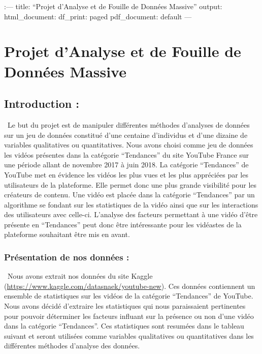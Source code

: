 \documentclass[
]{article}
\author{}
\date{\vspace{-2.5em}}
\begin{document}
:--- title: ``Projet d'Analyse et de Fouille de Données Massive''
output: html\_document: df\_print: paged pdf\_document: default ---

\hypertarget{projet-danalyse-et-de-fouille-de-donnuxe9es-massive}{%
\section{Projet d'Analyse et de Fouille de Données
Massive}\label{projet-danalyse-et-de-fouille-de-donnuxe9es-massive}}

\hypertarget{introduction}{%
\subsection{Introduction :}\label{introduction}}

 Le but du projet est de manipuler différentes méthodes d'analyses de
données sur un jeu de données constitué d'une centaine d'individus et
d'une dizaine de variables qualitatives ou quantitatives. Nous avons
choisi comme jeu de données les vidéos présentes dans la catégorie
``Tendances'' du site YouTube France sur une période allant de novembre
2017 à juin 2018. La catégorie ``Tendances'' de YouTube met en évidence
les vidéos les plus vues et les plus appréciées par les utilisateurs de
la plateforme. Elle permet donc une plus grande visibilité pour les
créateurs de contenu. Une vidéo est placée dans la catégorie
``Tendances'' par un algorithme se fondant sur les statistiques de la
vidéo ainsi que sur les interactions des utilisateurs avec celle-ci.
L'analyse des facteurs permettant à une vidéo d'être présente en
``Tendances'' peut donc être intéressante pour les vidéastes de la
plateforme souhaitant être mis en avant.

\hypertarget{pruxe9sentation-de-nos-donnuxe9es}{%
\subsubsection{Présentation de nos données
:}\label{pruxe9sentation-de-nos-donnuxe9es}}

 Nous avons extrait nos données du site Kaggle
(\url{https://www.kaggle.com/datasnaek/youtube-new}). Ces données
contiennent un ensemble de statistiques sur les vidéos de la catégorie
``Tendances'' de YouTube. Nous avons décidé d'extraire les statistiques
qui nous paraissaient pertinentes pour pouvoir déterminer les facteurs
influant sur la présence ou non d'une vidéo dans la catégorie
``Tendances''. Ces statistiques sont resumées dans le tableau suivant et
seront utilisées comme variables qualitatives ou quantitatives dans les
différentes méthodes d'analyse des données.
\end{document}

